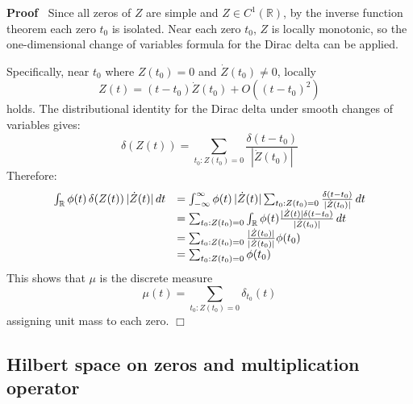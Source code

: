 \documentclass{article}
\newenvironment{proof}{\noindent\textbf{Proof\ }}{\hspace*{\fill}$\Box$\medskip}
\begin{document}
\begin{proof}
  Since all zeros of $Z$ are simple and $Z \in C^1 (\mathbb{R})$, by the
  inverse function theorem each zero $t_0$ is isolated. Near each zero $t_0$,
  $Z$ is locally monotonic, so the one-dimensional change of variables formula
  for the Dirac delta can be applied.
  
  Specifically, near $t_0$ where $Z (t_0) = 0$ and $\dot{Z} (t_0) \neq 0$,
  locally
  \begin{equation}
    Z (t) = (t - t_0)  \dot{Z} (t_0) + O ((t - t_0)^2)
  \end{equation}
  holds. The distributional identity for the Dirac delta under smooth changes
  of variables gives:
  \begin{equation}
    \delta (Z (t)) = \sum_{t_0 : Z (t_0) = 0} \frac{\delta (t - t_0)}{|
    \dot{Z} (t_0) |}
  \end{equation}
  Therefore:
  \begin{equation}
    \begin{array}{ll}
      \int_{\mathbb{R}} \phi (t)  \hspace{0.17em} \delta (Z (t))
      \hspace{0.17em} | \dot{Z} (t) |  \hspace{0.17em} dt & = \int_{-
      \infty}^{\infty} \phi (t) \hspace{0.17em} | \dot{Z} (t) |  \sum_{t_0 : Z
      (t_0) = 0} \frac{\delta (t - t_0)}{| \dot{Z} (t_0) |}  \hspace{0.17em}
      dt\\
      & = \sum_{t_0 : Z (t_0) = 0} \int_{\mathbb{R}} \phi (t) \frac{| \dot{Z}
      (t) | \delta (t - t_0)}{| \dot{Z} (t_0) |}  \hspace{0.17em} dt\\
      & = \sum_{t_0 : Z (t_0) = 0} \frac{| \dot{Z} (t_0) |}{| \dot{Z} (t_0)
      |} \phi (t_0)\\
      & = \sum_{t_0 : Z (t_0) = 0} \phi (t_0)
    \end{array}
  \end{equation}
  This shows that $\mu$ is the discrete measure
  \begin{equation}
    \mu (t) = \sum_{t_0 : Z (t_0) = 0} \delta_{t_0} (t)
  \end{equation}
  assigning unit mass to each zero.
\end{proof}

\subsection{Hilbert space on zeros and multiplication operator}
\end{document}
